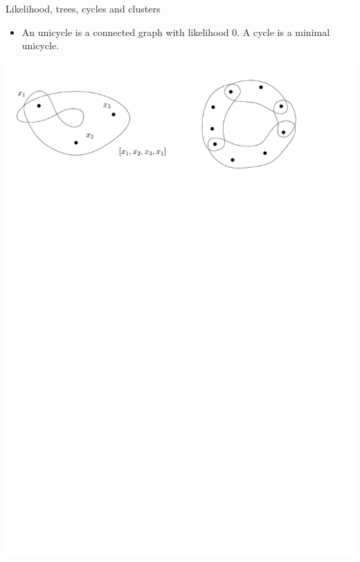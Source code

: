 \documentclass[11pt]{beamer}
\begin{document}
	\begin{frame}{Likelihood, trees, cycles and clusters} 
		\begin{itemize}
			\item An unicycle is a connected graph with likelihood $0$.
			A cycle is a minimal unicycle.
		\end{itemize}
		\begin{center}
			\includegraphics[width=0.9\linewidth]{Cycles.pdf}
		\end{center}
	\end{frame}
\end{document}
